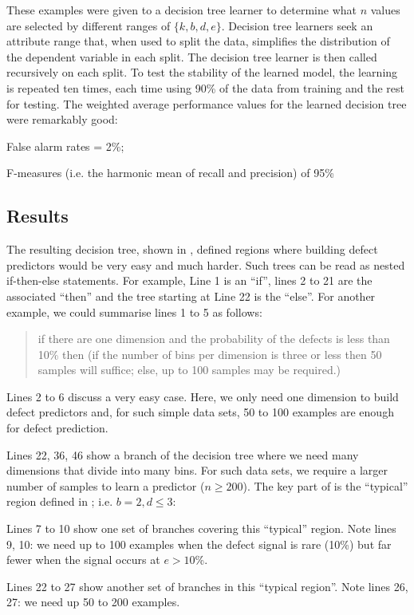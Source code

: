     These examples were given to a decision tree learner to determine what $n$ values are selected by different
    ranges of $\{k,b,d,e\}$. Decision tree learners seek an attribute range that, when used to split the data,
      simplifies the distribution of the dependent variable in each split.
      The decision tree learner is then called recursively on each split.  
      To test the stability of the learned model, the learning is repeated ten times, each time using 90\% of the data from training and the rest
      for testing. The weighted average performance values for the learned decision tree were remarkably good:
\squishlist
    \item False alarm rates = 2\%;
    \item F-measures (i.e. the harmonic mean of recall and precision) of 95\%
\squishend

\subsection{Results}

The resulting decision tree, shown in , defined regions where
building defect predictors would be very easy and much harder.
Such trees can be read as nested if-then-else statements. For example, Line 1 is an ``if'',
lines 2 to 21 are the associated ``then'' and the tree starting at Line 22 is the ``else''.
For another example, we could summarise lines 1 to 5 as follows:
\begin{quote}
if there are one dimension and the probability of the defects is less than 10\% then (if
the number of bins per dimension is three or less then 50 samples will suffice; else, up to 100
samples may be required.)
\end{quote}

\squishlist
\item
Lines 2 to 6 discuss a very easy case. Here, we only need
one dimension to build defect predictors and,
for such simple data sets, 50 to 100 examples are enough for defect prediction.
\item
Lines 22, 36, 46 show a branch of the decision tree
where we need many dimensions that divide into many bins.
For such data sets, we require a larger number of samples to learn a predictor ($n \ge 200$).
\squishend
The key part of  is the ``typical'' region defined in ;
i.e.    $b=2, d \le 3$:
\squishlist
\item Lines 7 to 10 show one set of branches covering this ``typical'' region. Note
lines 9, 10:  we need up to 100 examples when the defect signal is rare (10\%) but
far fewer when the signal occurs at $e>10$\%.
\item
Lines 22 to 27 show another set of branches in this ``typical region''. Note lines 26, 27:
we need up 50 to 200 examples.
\squishend
